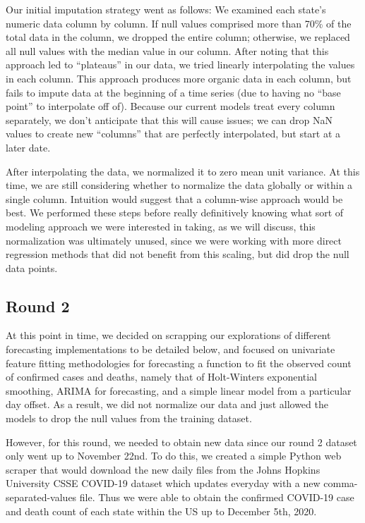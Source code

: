 \documentclass[sigconf,nonacm]{acmart}
\begin{document}
Our initial imputation strategy went as follows: We examined each state’s
numeric data column by column. If null values comprised more than 70\% of the
total data in the column, we dropped the entire column; otherwise, we replaced
all null values with the median value in our column. After noting that this
approach led to “plateaus” in our data, we tried linearly interpolating the
values in each column. This approach produces more organic data in each column,
but fails to impute data at the beginning of a time series (due to having no
“base point” to interpolate off of). Because our current models treat every
column separately, we don’t anticipate that this will cause issues; we can drop
NaN values to create new “columns” that are perfectly interpolated, but start
at a later date.  

After interpolating the data, we normalized it to zero mean unit variance. At
this time, we are still considering whether to normalize the data globally or
within a single column. Intuition would suggest that a column-wise approach
would be best. We performed these steps before really definitively knowing what
sort of modeling approach we were interested in taking, as we will discuss,
this normalization was ultimately unused, since we were working with more
direct regression methods that did not benefit from this scaling, but did drop
the null data points.

\subsection{Round 2}
At this point in time, we decided on scrapping our explorations of different
forecasting implementations to be detailed below, and focused on univariate
feature fitting methodologies for forecasting a function to fit the observed
count of confirmed cases and deaths, namely that of Holt-Winters exponential
smoothing, ARIMA for forecasting, and a simple linear model from a particular
day offset. As a result, we did not normalize our data and just allowed the
models to drop the null values from the training dataset.

However, for this round, we needed to obtain new data since our round 2 dataset
only went up to November 22nd. To do this, we created a simple Python web scraper that 
would download the new daily files from the Johns Hopkins University CSSE COVID-19 
dataset \cite{JHUdataset} which updates everyday with a new comma-separated-values file.
Thus we were able to obtain the confirmed COVID-19 case and death count of each state
within the US up to December 5th, 2020.
\end{document}

